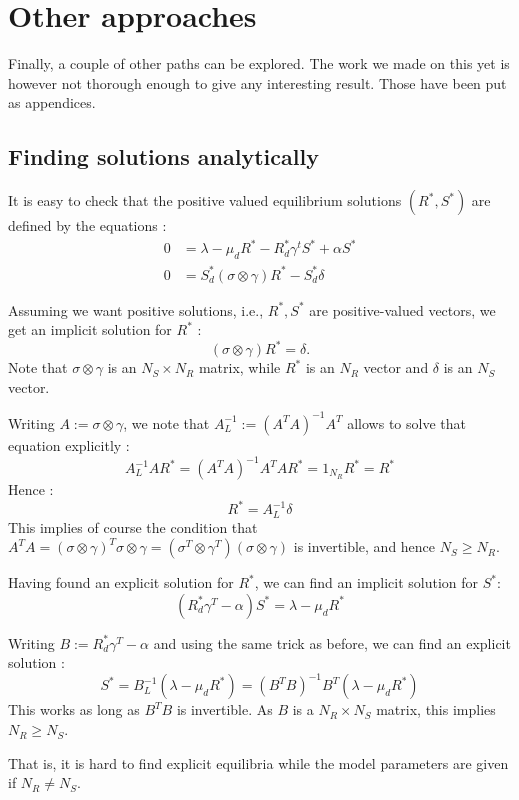 \documentclass[12pt]{article}
\begin{document}
			
	
	
	\section{Other approaches}	
	Finally, a couple of other paths can be explored. The work we made on this yet is however not thorough enough to give any interesting result. Those have been put as appendices.
	\begin{appendices}
		\clearpage
		\section{Finding solutions analytically}
		It is easy to check that the positive valued equilibrium solutions $(R^*, S^*)$ are defined by the equations : 
		\begin{align}
			0 &= \lambda - \mu_d R^* - R^*_d \gamma^t S^* + \alpha S^*  \label{eq : eq1}\\
			 0 &= S^*_d (\sigma \otimes \gamma) R^* - S^*_d \delta \label{eq : eq2}
		\end{align} 

		Assuming we want positive solutions, i.e., $R^*, S^*$ are positive-valued vectors, we get an implicit solution for $R^*$ : $$ (\sigma \otimes \gamma) R^* = \delta. $$ Note that $\sigma \otimes \gamma$ is an $N_S \times N_R$ matrix, while $R^*$ is an $N_R$ vector and $\delta$ is an $N_S$ vector.

		Writing $A:= \sigma \otimes \gamma$, we note that $A_L^{-1} := (A^T A)^{-1} A^T$ allows to solve that equation explicitly : $$ A_L^{-1} A R^* = (A^T A)^{-1} A^T A R^* = 1_{N_R} R^* = R^*$$ Hence : $$ R^* = A_L^{-1} \delta $$ This implies of course the condition that $A^T A = (\sigma \otimes \gamma)^T \sigma \otimes \gamma = (\sigma^T \otimes \gamma^T) (\sigma \otimes \gamma) $ is invertible, and hence $N_S \geq N_R $.

		Having found an explicit solution for $R^*$, we can find an implicit solution for $S^*$: $$ (R^*_d \gamma^T -\alpha) S^* = \lambda - \mu_d R^* $$

		Writing $B := R^*_d \gamma^T - \alpha$ and using the same trick as before, we can find an explicit solution : $$ S^* = B_L^{-1} (\lambda-\mu_d R^*) = (B^T B)^{-1} B^T (\lambda-\mu_d R^*) $$ This works as long as $B^T B$ is invertible. As $B$ is a $N_R \times N_S$ matrix, this implies $N_R \geq N_S$.

		That is, it is hard to find explicit equilibria while the model parameters are given if $N_R \neq N_S$.


\end{appendices}
\end{document}
